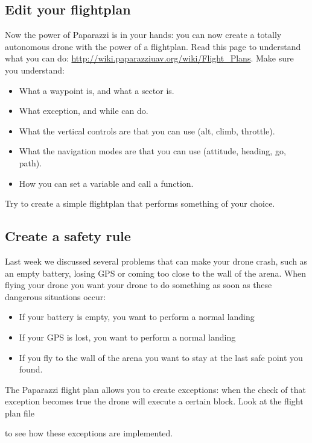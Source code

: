 \documentclass{article}
\begin{document}
\subsection*{Edit your flightplan}
Now the power of Paparazzi is in your hands: you can now create a totally autonomous drone with the power of a flightplan. Read this page to understand what you can do: \url{http://wiki.paparazziuav.org/wiki/Flight_Plans}. 
Make sure you understand:
\begin{itemize}
	\item What a waypoint is, and what a sector is. 
	\item What exception, and while can do. 
	\item What the vertical controls are that you can use (alt, climb, throttle).
	\item What the navigation modes are that you can use (attitude, heading, go, path). 
	\item How you can set a variable and call a function. 
\end{itemize}

Try to create a simple flightplan that performs something of your choice. 

\subsection*{Create a safety rule}
Last week we discussed several problems that can make your drone crash, such as an empty battery, losing GPS or coming too close to the wall of the arena.
When flying your drone you want your drone to do something as soon as these dangerous situations occur:
\begin{itemize}
\item If your battery is empty, you want to perform a normal landing
\item If your GPS is lost, you want to perform a normal landing
\item If you fly to the wall of the arena you want to stay at the last safe point you found. 
\end{itemize}
The Paparazzi flight plan allows you to create exceptions: when the check of that exception becomes true the drone will execute a certain block. Look at the flight plan file 

 to see how these exceptions are implemented. 
\end{document}
